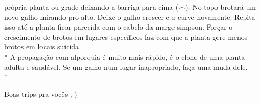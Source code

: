 própria planta ou grade deixando a barriga para cima ($\frown$). No topo 
brotará um novo galho mirando pro alto. Deixe o galho crescer e o curve 
novamente. Repita isso até a planta ficar parecida com o cabelo da marge 
simpson. Forçar o crescimento de brotos em lugares específicos faz com 
que a planta gere menos brotos em locais suicida\\*
A propagação com alporquia é muito mais rápido, é o clone de uma planta 
adulta e saudável. Se um galho num lugar inapropriado, faça uma muda 
dele.\\*
\hfill
\begin{flushright}Boas trips pra vocês ;-)\end{flushright}


%
%
%

